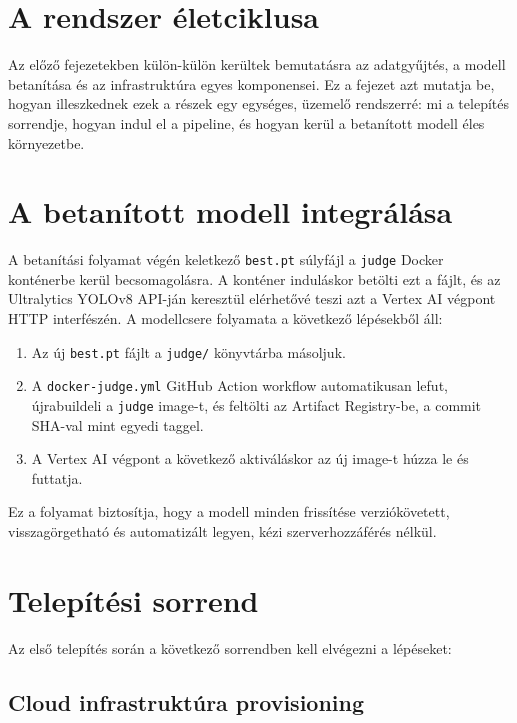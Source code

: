 \section{A rendszer életciklusa}

Az előző fejezetekben külön-külön kerültek bemutatásra az adatgyűjtés, a modell betanítása és az infrastruktúra egyes komponensei.
Ez a fejezet azt mutatja be, hogyan illeszkednek ezek a részek egy egységes, üzemelő rendszerré: mi a telepítés sorrendje,
hogyan indul el a pipeline, és hogyan kerül a betanított modell éles környezetbe.

\section{A betanított modell integrálása}

A betanítási folyamat végén keletkező \texttt{best.pt} súlyfájl a \texttt{judge} Docker konténerbe kerül becsomagolásra.
A konténer induláskor betölti ezt a fájlt, és az Ultralytics YOLOv8 API-ján keresztül elérhetővé teszi azt
a Vertex AI végpont HTTP interfészén. A modellcsere folyamata a következő lépésekből áll:

\begin{enumerate}
    \item Az új \texttt{best.pt} fájlt a \texttt{judge/} könyvtárba másoljuk.
    \item A \texttt{docker-judge.yml} GitHub Action workflow automatikusan lefut, újrabuildeli a \texttt{judge} image-t,
          és feltölti az Artifact Registry-be, a commit SHA-val mint egyedi taggel.
    \item A Vertex AI végpont a következő aktiváláskor az új image-t húzza le és futtatja.
\end{enumerate}

Ez a folyamat biztosítja, hogy a modell minden frissítése verziókövetett, visszagörgetható és automatizált legyen, kézi szerverhozzáférés nélkül.

\section{Telepítési sorrend}

Az első telepítés során a következő sorrendben kell elvégezni a lépéseket:

\subsection{Cloud infrastruktúra provisioning}

